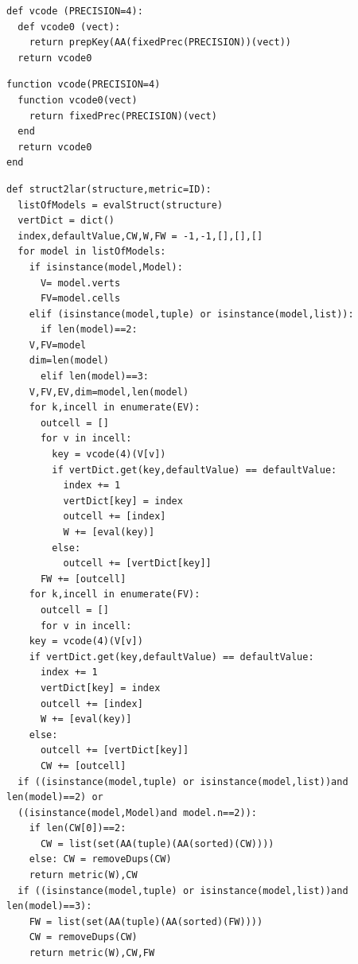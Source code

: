 \documentclass[a4paper,12pt]{article}
\begin{document}
\noindent {}
\begin{multicols}{2}
\noindent {}
\begin{Verbatim}[fontsize=\scriptsize]
def vcode (PRECISION=4):
  def vcode0 (vect):
    return prepKey(AA(fixedPrec(PRECISION))(vect))
  return vcode0  
\end{Verbatim}
\columnbreak
{}
\begin{Verbatim}[fontsize=\scriptsize]
function vcode(PRECISION=4)
  function vcode0(vect)
    return fixedPrec(PRECISION)(vect)
  end
  return vcode0
end
\end{Verbatim}
\end{multicols}
\noindent {}
\begin{Verbatim}[fontsize=\footnotesize]
def struct2lar(structure,metric=ID):
  listOfModels = evalStruct(structure)
  vertDict = dict()
  index,defaultValue,CW,W,FW = -1,-1,[],[],[]
  for model in listOfModels:
    if isinstance(model,Model):
      V= model.verts
      FV=model.cells
    elif (isinstance(model,tuple) or isinstance(model,list)):
      if len(model)==2:
	V,FV=model
	dim=len(model)
      elif len(model)==3: 
	V,FV,EV,dim=model,len(model)
	for k,incell in enumerate(EV):
	  outcell = []
	  for v in incell:
	    key = vcode(4)(V[v])
	    if vertDict.get(key,defaultValue) == defaultValue:
	      index += 1
	      vertDict[key] = index
	      outcell += [index]
	      W += [eval(key)]
	    else: 
	      outcell += [vertDict[key]]
	  FW += [outcell]
    for k,incell in enumerate(FV):
      outcell = []
      for v in incell:
	key = vcode(4)(V[v])
	if vertDict.get(key,defaultValue) == defaultValue:
	  index += 1
	  vertDict[key] = index
	  outcell += [index]
	  W += [eval(key)]
	else: 
	  outcell += [vertDict[key]]
      CW += [outcell]
  if ((isinstance(model,tuple) or isinstance(model,list))and len(model)==2) or 
  ((isinstance(model,Model)and model.n==2)):
    if len(CW[0])==2:
      CW = list(set(AA(tuple)(AA(sorted)(CW))))
    else: CW = removeDups(CW)
    return metric(W),CW
  if ((isinstance(model,tuple) or isinstance(model,list))and len(model)==3):
    FW = list(set(AA(tuple)(AA(sorted)(FW))))
    CW = removeDups(CW)
    return metric(W),CW,FW
\end{Verbatim}
\noindent {}
\end{document}

